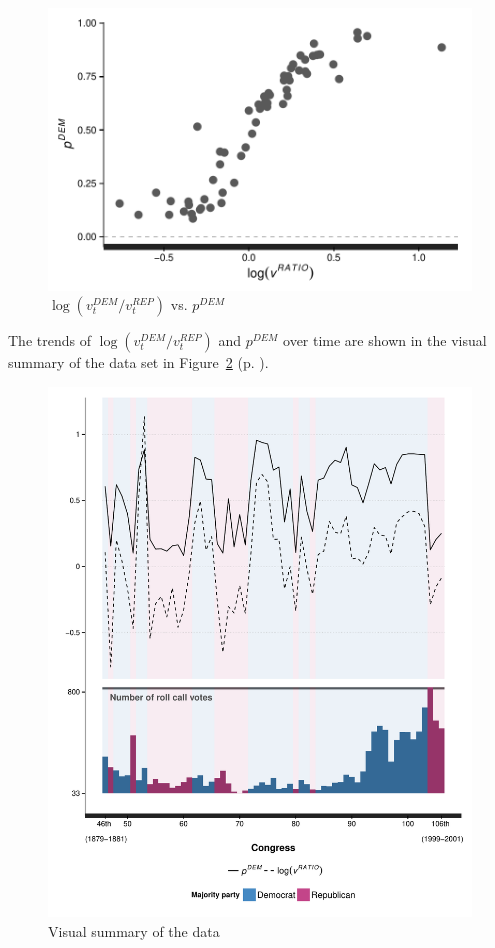 \begin{figure}[h]
\centering
	\includegraphics[scale=0.75]{sections/figs/logvratio_vs_pdem}
\caption{$\log{(v_t^{DEM} / v_t^{REP} )}$  vs. $p^{DEM}$}
\label{fig:log_vratio_vs_ptdem}
\end{figure}
%

The trends of $\log{(v_t^{DEM} / v_t^{REP} )}$ and $p^{DEM}$ over time are shown in the visual summary of the data set in Figure~\ref{fig:data_summary} (p. \pageref{fig:data_summary}).


\begin{figure}
\centering
	\includegraphics[scale=0.75]{sections/figs/vis_summary}
\caption{Visual summary of the data}
\label{fig:data_summary}
\end{figure}
%

